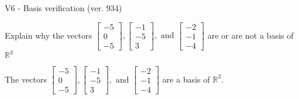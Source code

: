 \begin{exercise}
  \begin{exerciseTitle}V6 - Basis verification (ver. 934)\end{exerciseTitle}
  \begin{exerciseStatement}
    Explain why the vectors \(\left[\begin{array}{r}
-5 \\
0 \\
-5
\end{array}\right] , \left[\begin{array}{r}
-1 \\
-5 \\
3
\end{array}\right] , \text{ and } \left[\begin{array}{r}
-2 \\
-1 \\
-4
\end{array}\right]\) are or are not a basis of \(\mathbb{R}^3\)	


  \end{exerciseStatement}
  \begin{exerciseAnswer}
   The vectors \(\left[\begin{array}{r}
-5 \\
0 \\
-5
\end{array}\right] , \left[\begin{array}{r}
-1 \\
-5 \\
3
\end{array}\right] , \text{ and } \left[\begin{array}{r}
-2 \\
-1 \\
-4
\end{array}\right]\) 
  	 are  a basis of \(\mathbb{R}^3\).
  


  \end{exerciseAnswer}
\end{exercise}